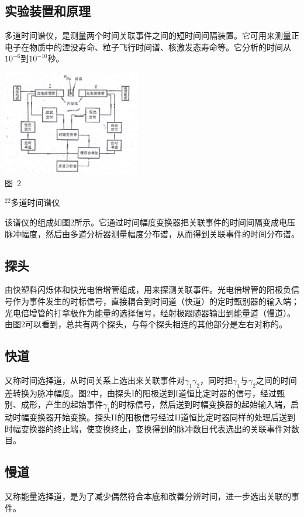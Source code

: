 \documentclass[a4paper,10.0pt,twoside]{npr}
\begin{document}
\begin{multicols}{2}
\section{实验装置和原理}
多道时间谱仪，是测量两个时间关联事件之间的短时间间隔装置。它可用来测量正电子在物质中的湮没寿命、粒子飞行时间谱、核激发态寿命等。它分析的时间从$10^{-6}$到$10^{-10}$秒。

\begin{center}
   \includegraphics[width=0.45\textwidth]{2.png}
\\
\xiaowu\song 图~2\begin{minipage}[t]{75mm} \quad $^{22}$多道时间谱仪\\[-1mm]\wuhao
\end{minipage}
\end{center}

该谱仪的组成如图2所示。它通过时间幅度变换器把关联事件的时间间隔变成电压脉冲幅度，然后由多道分析器测量幅度分布谱，从而得到关联事件的时间分布谱。

\subsection{探头}
由快塑料闪烁体和快光电倍增管组成，用来探测关联事件。光电倍增管的阳极负信号作为事件发生的时标信号，直接耦合到时间道（快道）的定时甄别器的输入端；光电倍增管的打拿极作为能量的选择信号，经射极跟随器输出到能量道（慢道）。由图2可以看到，总共有两个探头，与每个探头相连的其他部分是左右对称的。
\subsection{快道}
又称时间选择道，从时间关系上选出来关联事件对$\gamma_1\gamma_2$，同时把$\gamma_1$与$\gamma_2$之间的时间差转换为脉冲幅度。图2中，由探头I的阳极送到I道恒比定时器的信号，经过甄别、成形，产生的起始事件$\gamma_1$的时标信号，然后送到时幅变换器的起始输入端，启动时幅变换器开始变换。探头II的阳极信号经过II道恒比定时器同样的处理后送到时幅变换器的终止端，使变换终止，变换得到的脉冲数目代表选出的关联事件对数目。
\subsection{慢道}
又称能量选择道，是为了减少偶然符合本底和改善分辨时间，进一步选出关联的事件。

\end{multicols}
\end{document}
